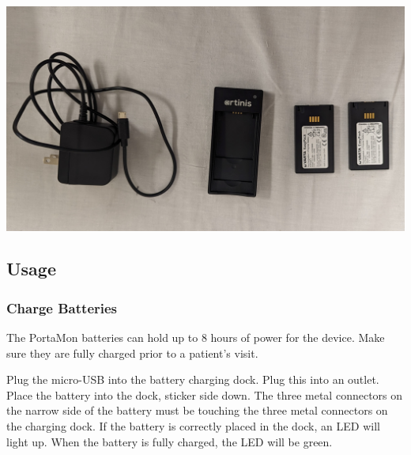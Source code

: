 \documentclass[
]{book}
\begin{document}
\includegraphics[width=1\linewidth]{images/portamonbatteriesandcharger}

\hypertarget{Appendix-Instruments-PortaMon-Usage}{%
\subsection{Usage}\label{Appendix-Instruments-PortaMon-Usage}}

\hypertarget{Appendix-Instruments-PortaMon-Usage-ChargeBatteries}{%
\subsubsection{Charge Batteries}\label{Appendix-Instruments-PortaMon-Usage-ChargeBatteries}}

The PortaMon batteries can hold up to 8 hours of power for the device. Make sure they are fully charged prior to a patient's visit.

Plug the micro-USB into the battery charging dock. Plug this into an outlet. Place the battery into the dock, sticker side down. The three metal connectors on the narrow side of the battery must be touching the three metal connectors on the charging dock. If the battery is correctly placed in the dock, an LED will light up. When the battery is fully charged, the LED will be green.
\end{document}
